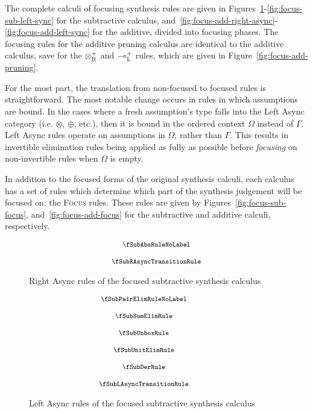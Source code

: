 The complete calculi of focusing synthesis rules are given in
Figures~\ref{fig:focus-sub-right-async}-\ref{fig:focus-sub-left-sync} for the
subtractive calculus,
and~\ref{fig:focus-add-right-async}-\ref{fig:focus-add-left-sync} for the
additive, divided into focusing phases. The focusing rules for the additive pruning 
calculus are identical to the additive calculus, save for the $\otimes^{+}_{\textsc{R}}$ and 
$\multimap^{+}_{\textsc{L}}$ rules, which are given in Figure~\ref{fig:focus-add-pruning}.

For the most part, the translation from
non-focused to focused rules is straightforward. The most notable change occurs
in rules in which assumptions are bound. In the cases where a fresh assumption's
type falls into the Left Async category (i.e. $\otimes$, $\oplus$, etc.), then it is bound in the
ordered context $\Omega$ instead of $\Gamma$. Left Async rules 
operate on assumptions in $\Omega$, rather than $\Gamma$. This results in invertible elimination rules
being applied as fully as possible before \textit{focusing} on non-invertible
rules when $\Omega$ is empty.

In addition to the focused forms of the original synthesis calculi, each
calculus has a set of rules which determine which part of the synthesis
judgement will be focused on: the \textsc{Focus} rules. These rules are given by
Figures~\ref{fig:focus-sub-focus}, and~\ref{fig:focus-add-focus} for the
subtractive and additive calculi, respectively.


\begin{figure}[H]
  \begin{align*}
    {\footnotesize{
\begin{array}{c}
  \fSubAbsRuleNoLabel
  \\[1.25em]
  \fSubRAsyncTransitionRule
  \end{array}
    }}
  \end{align*}
  \caption{Right Async rules of the focused subtractive synthesis calculus}
  \label{fig:focus-sub-right-async}
\end{figure}

\begin{figure}[H]
  \begin{align*}
    {\footnotesize{
\hspace{-3.5em}\begin{array}{c}
  \fSubPairElimRuleNoLabel
  \\[1.25em]
  \fSubSumElimRule
  \\[1.25em]
  \fSubUnboxRule
  \\[1.25em]
  \fSubUnitElimRule
  \\[1.25em]
  \fSubDerRule
  \\[1.25em]
  \fSubLAsyncTransitionRule
  \end{array}
    }}
  \end{align*}
  \caption{Left Async rules of the focused subtractive synthesis calculus}
  \label{fig:focus-sub-left-async}
\end{figure}

